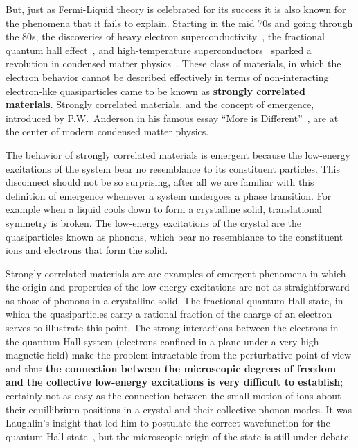 \documentclass[oneside,11pt]{memoir}
\begin{document}
But, just as Fermi-Liquid theory is celebrated for its success it is also known
for the phenomena that it fails to explain.   Starting in the mid 70s and going
through the 80s, the discoveries of heavy electron
superconductivity~\cite{PhysRevLett.35.1779,PhysRevLett.43.1892},  the
fractional quantum hall effect~\cite{PhysRevLett.48.1559,PhysRevLett.50.1395},
and high-temperature superconductors~\cite{Zeitschrift.64.189} sparked a
revolution in condensed matter physics~\cite{coleman2004revolution}.   These
class of materials, in which the electron behavior cannot be described
effectively in terms of non-interacting electron-like quasiparticles came to be
known as \textbf{strongly correlated materials}.   Strongly correlated
materials, and the concept of emergence, introduced by P.W.~Anderson in his
famous essay ``More is Different''~\cite{Anderson1972}, are at the center of
modern condensed matter physics. 

The behavior of strongly correlated materials is emergent because the
low-energy excitations of the system bear no resemblance to its constituent
particles.  This disconnect should not be so surprising, after all we are familiar
with this definition of emergence whenever a system undergoes a phase
transition.  For example when a liquid cools down to form a crystalline solid,
translational symmetry is broken.    The low-energy excitations of the crystal
are the quasiparticles known as phonons, which bear no resemblance to the
constituent ions and electrons that form the solid.   

Strongly correlated materials are are examples of emergent phenomena in which
the origin and properties of the low-energy excitations are not as
straightforward as those of phonons in a crystalline solid.  The fractional
quantum Hall state, in which the quasiparticles carry a rational fraction of
the charge of an electron serves to illustrate this point.  The strong
interactions between the electrons in the quantum Hall system (electrons
confined in a plane under a very high magnetic field) make the problem
intractable from the perturbative point of view and thus \textbf{the connection
between the microscopic degrees of freedom and the collective low-energy
excitations is very difficult to establish}; certainly not as easy as the
connection between the small motion of ions about their equillibrium positions
in a crystal and their collective phonon modes. It was Laughlin's insight that
led him to postulate the correct wavefunction  for the quantum Hall
state~\cite{PhysRevLett.50.1395}, but the microscopic origin of the state is
still under debate.   
\end{document}
